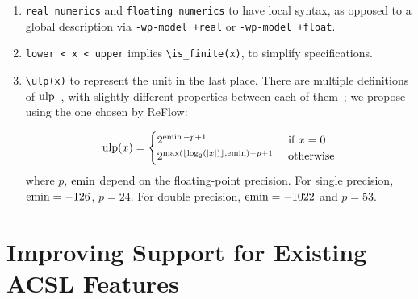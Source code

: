 \begin{enumerate}

\itembf \verb|\uncertainty| predicate. This allows to model sources of error external to Frama-C; i.e., from physical phenomena or other analysis from external tools. For example,

    \begin{listing-nonumber}
    /*@ requires 0.0 <= x <= 1000.0;
        requires \uncertainty(x,-5.0,5.0); */
    \end{listing-nonumber}

\item
\lstinline|real numerics| and \lstinline|floating numerics| to have local syntax, as opposed to a global description via \verb|-wp-model +real| or \verb|-wp-model +float|.

\item \lstinline|lower < x < upper| implies \lstinline|\is_finite(x)|, to simplify specifications.
\item \lstinline|\ulp(x)| to represent the unit in the last place. There are multiple definitions of $\operatorname{ulp}$~\cite{muller:2005:ulp}, with slightly different properties between each of them~\cite{muller:2018:handbook}; we propose using the one chosen by ReFlow:

    \[
        \operatorname{ulp}(x) = \begin{cases}
            2^{\operatorname{emin} - p + 1}                                   & \text{ if } x = 0 \\
            2^{\max(\lfloor \log_2(|x|)\rfloor, \operatorname{emin}) - p + 1} & \text{ otherwise}
        \end{cases}
    \]
    where $p$, $\operatorname{emin}$ depend on the floating-point precision.
	For single precision, $\operatorname{emin} = -126$, $p = 24$.
	For double precision, $\operatorname{emin} = -1022$ and $p = 53$.

\end{enumerate}

\section{Improving Support for Existing ACSL Features}

